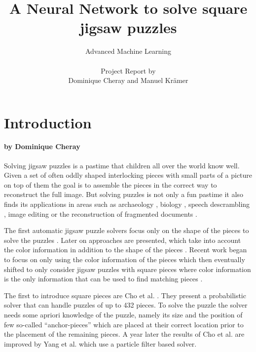 \documentclass[11pt]{report}
\title{\textbf{A Neural Network to solve square jigsaw puzzles}}
\author{Advanced Machine Learning \\ \\
  Project Report by \\
  Dominique Cheray and Manuel Krämer}
\begin{document}
\maketitle

\tableofcontents

\chapter{Introduction}
\subsubsection*{by Dominique Cheray}
Solving jigsaw puzzles is a pastime that children all over the world know well.
Given a set of often oddly shaped interlocking pieces with small parts of a
picture on top of them the goal is to assemble the pieces in the correct way to
reconstruct the full image. But solving puzzles is not only a fun pastime it
also finds its applications in areas such as archaeology \cite{brown2008system,
  liu2011automated, koller2006computer}, biology
\cite{marande2007mitochondrial}, speech descrambling \cite{zhao2007puzzle},
image editing \cite{cho2008patch} or the reconstruction of fragmented documents
\cite{zhu2008globally}.

The first automatic jigsaw puzzle solvers focus only on the shape of the pieces
to solve the puzzles \cite{freeman1964apictorial, wolfson1988solving,
webster1990computer, kong2001solving}. Later on approaches are presented, which
take into account the color information in addition to the shape of the pieces
\cite{kosiba1994automatic, makridis2006new, sagiroglu2006texture}. Recent work
began to focus on only using the color information of the pieces
\cite{nielsen2008solving} which then eventually shifted to only consider jigsaw
puzzles with square pieces where color information is the only information that
can be used to find matching pieces \cite{Cho2010, yang2011particle,
  Pomeranz2011, gallagher2012jigsaw, son2014solving, sholomon2013genetic,
  Paikin2015, sholomon2016dnn}.

The first to introduce square pieces are Cho et al. \cite{Cho2010}. They present
a probabilistic solver that can handle puzzles of up to 432 pieces. To solve the
puzzle the solver needs some apriori knowledge of the puzzle, namely its size
and the position of few so-called ``anchor-pieces'' which are placed at their
correct location prior to the placement of the remaining pieces. A year later
the results of Cho et al. are improved by Yang et al. \cite{yang2011particle}
which use a particle filter based solver.
\end{document}
